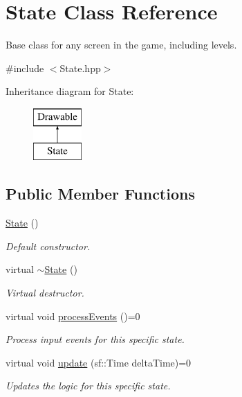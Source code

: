 \hypertarget{class_state}{}\section{State Class Reference}
\label{class_state}


Base class for any screen in the game, including levels.  




{\ttfamily \#include $<$State.\+hpp$>$}

Inheritance diagram for State\+:\begin{figure}[H]
\begin{center}
\leavevmode
\includegraphics[height=2.000000cm]{class_state}
\end{center}
\end{figure}
\subsection*{Public Member Functions}
\begin{DoxyCompactItemize}
\item 
\mbox{\label{class_state_ab91bb1dd5aa6260ab2a456581daf9ec2}} 
\mbox{\hyperlink{class_state_ab91bb1dd5aa6260ab2a456581daf9ec2}{State}} ()
\begin{DoxyCompactList}\small\item\em Default constructor. \end{DoxyCompactList}\item 
\mbox{\label{class_state_afab438d92b90dc18d194dbd9c9c8bab3}} 
virtual \mbox{\hyperlink{class_state_afab438d92b90dc18d194dbd9c9c8bab3}{$\sim$\+State}} ()
\begin{DoxyCompactList}\small\item\em Virtual destructor. \end{DoxyCompactList}\item 
\mbox{\label{class_state_a8e83a0c8ff9dd3b0f0fb24f7f1b5b4c4}} 
virtual void \mbox{\hyperlink{class_state_a8e83a0c8ff9dd3b0f0fb24f7f1b5b4c4}{process\+Events}} ()=0
\begin{DoxyCompactList}\small\item\em Process input events for this specific state. \end{DoxyCompactList}\item 
virtual void \mbox{\hyperlink{class_state_acd1d5612d4166c405fb4a11b3a1f1bd3}{update}} (sf\+::\+Time delta\+Time)=0
\begin{DoxyCompactList}\small\item\em Updates the logic for this specific state. \end{DoxyCompactList}\end{DoxyCompactItemize}
